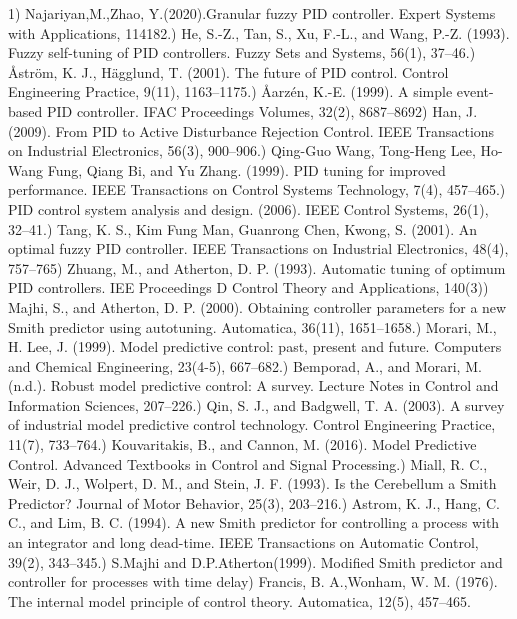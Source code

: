 \documentclass[9pt]{article}
\begin{document}
1) Najariyan,M.,Zhao, Y.(2020).Granular fuzzy PID controller. Expert Systems with Applications, 114182.)  He, S.-Z., Tan, S., Xu, F.-L., and Wang, P.-Z. (1993). Fuzzy self-tuning of PID controllers. Fuzzy Sets and Systems, 56(1), 37–46.) Åström, K. J., Hägglund, T. (2001). The future of PID control. Control Engineering Practice, 9(11), 1163–1175.) Åarzén, K.-E. (1999). A simple event-based PID controller. IFAC Proceedings Volumes, 32(2), 8687–8692) Han, J. (2009). From PID to Active Disturbance Rejection Control. IEEE Transactions on Industrial Electronics, 56(3), 900–906.) Qing-Guo Wang, Tong-Heng Lee, Ho-Wang Fung, Qiang Bi, and Yu Zhang. (1999). PID tuning for improved performance. IEEE Transactions on Control Systems Technology, 7(4), 457–465.) PID control system analysis and design. (2006). IEEE Control Systems, 26(1), 32–41.) Tang, K. S., Kim Fung Man, Guanrong Chen, Kwong, S. (2001). An optimal fuzzy PID controller. IEEE Transactions on Industrial Electronics, 48(4), 757–765) Zhuang, M., and Atherton, D. P. (1993). Automatic tuning of optimum PID controllers. IEE Proceedings D Control Theory and Applications, 140(3)) Majhi, S., and Atherton, D. P. (2000). Obtaining controller parameters for a new Smith predictor using autotuning. Automatica, 36(11), 1651–1658.) Morari, M., H. Lee, J. (1999). Model predictive control: past, present and future. Computers and Chemical Engineering, 23(4-5), 667–682.) Bemporad, A., and Morari, M. (n.d.). Robust model predictive control: A survey. Lecture Notes in Control and Information Sciences, 207–226.) Qin, S. J., and Badgwell, T. A. (2003). A survey of industrial model predictive control technology. Control Engineering Practice, 11(7), 733–764.) Kouvaritakis, B., and Cannon, M. (2016). Model Predictive Control. Advanced Textbooks in Control and Signal Processing.) Miall, R. C., Weir, D. J., Wolpert, D. M., and Stein, J. F. (1993). Is the Cerebellum a Smith Predictor? Journal of Motor Behavior, 25(3), 203–216.) Astrom, K. J., Hang, C. C., and Lim, B. C. (1994). A new Smith predictor for controlling a process with an integrator and long dead-time. IEEE Transactions on Automatic Control, 39(2), 343–345.) S.Majhi and D.P.Atherton(1999). Modified Smith predictor and controller for processes with time delay) Francis, B. A.,Wonham, W. M. (1976). The internal model principle of control theory. Automatica, 12(5), 457–465. 
\end{document}
